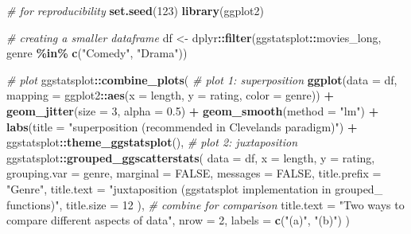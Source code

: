 \documentclass[
]{article}
\newenvironment{Shaded}{\begin{snugshade}}{\end{snugshade}}
\newcommand{\CommentTok}[1]{\textcolor[rgb]{0.56,0.35,0.01}{\textit{#1}}}
\newcommand{\DataTypeTok}[1]{\textcolor[rgb]{0.13,0.29,0.53}{#1}}
\newcommand{\DecValTok}[1]{\textcolor[rgb]{0.00,0.00,0.81}{#1}}
\newcommand{\FloatTok}[1]{\textcolor[rgb]{0.00,0.00,0.81}{#1}}
\newcommand{\KeywordTok}[1]{\textcolor[rgb]{0.13,0.29,0.53}{\textbf{#1}}}
\newcommand{\NormalTok}[1]{#1}
\newcommand{\OperatorTok}[1]{\textcolor[rgb]{0.81,0.36,0.00}{\textbf{#1}}}
\newcommand{\OtherTok}[1]{\textcolor[rgb]{0.56,0.35,0.01}{#1}}
\newcommand{\StringTok}[1]{\textcolor[rgb]{0.31,0.60,0.02}{#1}}
\begin{document}
\begin{Shaded}
\begin{Highlighting}[]
\CommentTok{\# for reproducibility}
\KeywordTok{set.seed}\NormalTok{(}\DecValTok{123}\NormalTok{)}
\KeywordTok{library}\NormalTok{(ggplot2)}

\CommentTok{\# creating a smaller dataframe}
\NormalTok{df \textless{}{-}}\StringTok{ }\NormalTok{dplyr}\OperatorTok{::}\KeywordTok{filter}\NormalTok{(ggstatsplot}\OperatorTok{::}\NormalTok{movies\_long, genre }\OperatorTok{\%in\%}\StringTok{ }\KeywordTok{c}\NormalTok{(}\StringTok{"Comedy"}\NormalTok{, }\StringTok{"Drama"}\NormalTok{))}

\CommentTok{\# plot}
\NormalTok{ggstatsplot}\OperatorTok{::}\KeywordTok{combine\_plots}\NormalTok{(}
  \CommentTok{\# plot 1: superposition}
  \KeywordTok{ggplot}\NormalTok{(}\DataTypeTok{data =}\NormalTok{ df, }\DataTypeTok{mapping =}\NormalTok{ ggplot2}\OperatorTok{::}\KeywordTok{aes}\NormalTok{(}\DataTypeTok{x =}\NormalTok{ length, }\DataTypeTok{y =}\NormalTok{ rating, }\DataTypeTok{color =}\NormalTok{ genre)) }\OperatorTok{+}
\StringTok{    }\KeywordTok{geom\_jitter}\NormalTok{(}\DataTypeTok{size =} \DecValTok{3}\NormalTok{, }\DataTypeTok{alpha =} \FloatTok{0.5}\NormalTok{) }\OperatorTok{+}
\StringTok{    }\KeywordTok{geom\_smooth}\NormalTok{(}\DataTypeTok{method =} \StringTok{"lm"}\NormalTok{) }\OperatorTok{+}
\StringTok{    }\KeywordTok{labs}\NormalTok{(}\DataTypeTok{title =} \StringTok{"superposition (recommended in Cleveland\textquotesingle{}s paradigm)"}\NormalTok{) }\OperatorTok{+}
\StringTok{    }\NormalTok{ggstatsplot}\OperatorTok{::}\KeywordTok{theme\_ggstatsplot}\NormalTok{(),}
  \CommentTok{\# plot 2: juxtaposition}
\NormalTok{  ggstatsplot}\OperatorTok{::}\KeywordTok{grouped\_ggscatterstats}\NormalTok{(}
    \DataTypeTok{data =}\NormalTok{ df,}
    \DataTypeTok{x =}\NormalTok{ length,}
    \DataTypeTok{y =}\NormalTok{ rating,}
    \DataTypeTok{grouping.var =}\NormalTok{ genre,}
    \DataTypeTok{marginal =} \OtherTok{FALSE}\NormalTok{,}
    \DataTypeTok{messages =} \OtherTok{FALSE}\NormalTok{,}
    \DataTypeTok{title.prefix =} \StringTok{"Genre"}\NormalTok{,}
    \DataTypeTok{title.text =} \StringTok{"juxtaposition (\textasciigrave{}ggstatsplot\textasciigrave{} implementation in \textasciigrave{}grouped\_\textasciigrave{} functions)"}\NormalTok{,}
    \DataTypeTok{title.size =} \DecValTok{12}
\NormalTok{  ),}
  \CommentTok{\# combine for comparison}
  \DataTypeTok{title.text =} \StringTok{"Two ways to compare different aspects of data"}\NormalTok{,}
  \DataTypeTok{nrow =} \DecValTok{2}\NormalTok{,}
  \DataTypeTok{labels =} \KeywordTok{c}\NormalTok{(}\StringTok{"(a)"}\NormalTok{, }\StringTok{"(b)"}\NormalTok{)}
\NormalTok{)}
\end{Highlighting}
\end{Shaded}
\end{document}
